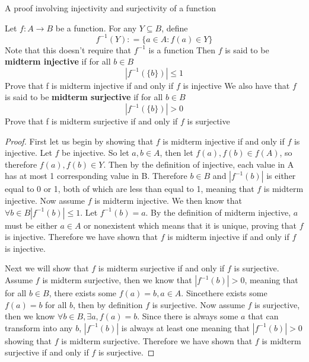 A proof involving injectivity and surjectivity of a function

Let $f: A\rightarrow B$ be a function. For any $Y \subseteq B$, define
$$ f^{-1}(Y): = \{a \in A: f(a) \in Y\} $$
Note that this doesn't require that $f^{-1}$ is a function
Then $f$ is said to be \textbf{midterm injective} if for all $b \in B$
$$|f^{-1} (\{b\})| \leq 1 $$
Prove that f is midterm injective if and only if $f$ is injective
We also have that $f$ is said to be \textbf{midterm surjective} if for all $b \in B$
$$| f^{-1}(\{b\})| > 0 $$
Prove that f is midterm surjective if and only if $f$ is surjective

\begin{proof}
First let us begin by showing that $f$ is midterm injective if and only if $f$ is injective.
Let $f$ be injective. So let $a,b \in A$, then let $f(a),f(b) \in f(A)$, so therefore $f(a),f(b) \in Y$. Then by the definition of injective, each value in A has at most 1 corresponding value in B. Therefore $b\in B$ and $|f^{-1} (b)|$ is either equal to 0 or 1, both of which are less than equal to 1, meaning that $f$ is midterm injective.
Now assume $f$ is midterm injective. We then know that $\forall b \in B  |f^{-1} (b)| \leq 1$. Let $f^{-1} (b) = a$. By the definition of midterm injective, $a$ must be either $a \in A$ or nonexistent which means that it is unique, proving that $f$ is injective. Therefore we have shown that $f$ is midterm injective if and only if $f$ is injective.

Next we will show that $f$ is midterm surjective if and only if $f$ is surjective. Assume $f$ is midterm surjective, then we know that $|f^{-1} (b)|  > 0$, meaning that for all $b \in B$, there exists some $f(a) = b, a \in A$. Sincethere exists some $f(a) = b$ for all $b$, then by definition $f$ is surjective.
Now assume $f$ is surjective, then we know $\forall b \in B, \exists a , f(a) = b$. Since there is always some $a$ that can transform into any $b$, $|f^{-1} (b)|$ is always at least one meaning that $|f^{-1} (b)| > 0$ showing that $f$ is midterm surjective.
Therefore we have shown that $f$ is midterm surjective if and only if $f$ is surjective.
\end{proof}